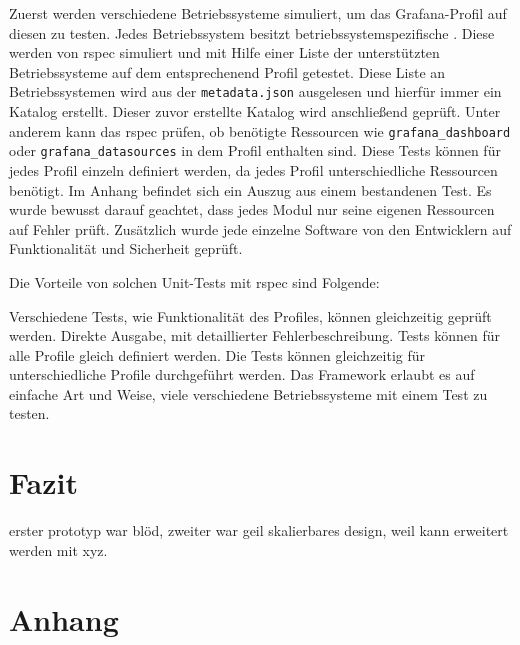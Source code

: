 Zuerst werden verschiedene Betriebssysteme simuliert, um das Grafana-Profil auf
diesen zu testen. Jedes Betriebssystem besitzt betriebssystemspezifische
. Diese werden von rspec simuliert und mit Hilfe einer
Liste der unterstützten Betriebssysteme auf dem entsprechenend Profil
getestet. Diese Liste an Betriebssystemen wird aus der \texttt{metadata.json}
ausgelesen und hierfür immer ein Katalog erstellt. Dieser zuvor erstellte
Katalog wird anschließend geprüft. Unter anderem kann das rspec prüfen, ob
benötigte Ressourcen wie \texttt{grafana\_dashboard} oder
\texttt{grafana\_datasources} in dem Profil enthalten sind. Diese Tests können
für jedes Profil einzeln definiert werden, da jedes Profil unterschiedliche
Ressourcen benötigt. Im Anhang befindet sich ein Auszug aus einem bestandenen
Test. Es wurde bewusst darauf geachtet, dass jedes Modul nur seine eigenen
Ressourcen auf Fehler prüft. Zusätzlich wurde jede einzelne Software
von den Entwicklern auf Funktionalität und Sicherheit geprüft.

Die Vorteile von solchen Unit-Tests mit rspec sind Folgende:

\begin{outline}
  \1 Verschiedene Tests, wie Funktionalität des Profiles, können gleichzeitig
  geprüft werden.
  \1 Direkte Ausgabe, mit detaillierter Fehlerbeschreibung.
  \1 Tests können für alle Profile gleich definiert werden.
  \1 Die Tests können gleichzeitig für unterschiedliche Profile durchgeführt
  werden.
  \1 Das Framework erlaubt es auf einfache Art und Weise, viele verschiedene
  Betriebssysteme mit einem Test zu testen.
\end{outline}
\mr%

\chapter{Fazit}
erster prototyp war blöd, zweiter war geil
skalierbares design, weil
kann erweitert werden mit xyz.

\appendix

\printglossaries%

\printbibliography[heading=bibnumbered]

\chapter{Anhang}





